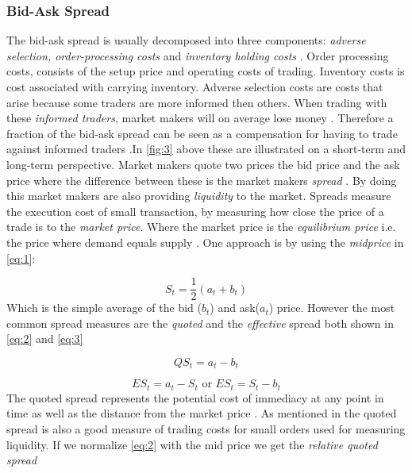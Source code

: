 \documentclass{kththesis}
\theoremstyle{definition}
\begin{document}
\subsubsection*{Bid-Ask Spread}

The bid-ask spread is usually decomposed into three components: \textit{adverse selection, order-processing costs} and \textit{inventory holding costs} \parencite{foucault2013market}. Order processing costs, consists of the setup price and operating costs of trading. Inventory costs is cost associated with carrying inventory. Adverse selection costs are costs that arise because some traders are more informed then others. When trading with these \textit{informed traders}, market makers will on average lose money \parencite{darley2007nasdaq}. Therefore a fraction of the bid-ask spread can be seen as a compensation for having to trade against informed traders \parencite{darley2007nasdaq}.In \autoref{fig:3} above these are illustrated on a short-term and long-term perspective.
\newline
\newline
Market makers quote two prices the bid price and the ask price where the difference between these is the market makers \textit{spread} \parencite{madhavan2000market}. By doing this market makers are also providing \textit{liquidity} to the market. Spreads measure the execution cost of small transaction, by measuring how close the price of a trade is to the \textit{market price}. Where the market price is the \textit{equilibrium price} i.e. the price where demand equals supply \parencite{cartea2015algorithmic}. One approach is by using the \textit{midprice} in \autoref{eq:1}:

\begin{equation}
    \label{eq:1}
    S_{t} = \frac{1}{2}(a_t + b_t)
\end{equation}
Which is the simple average of the bid ($b_t$) and ask($a_t$) price.
However the most common spread measures are the \textit{quoted} and the \textit{effective} \parencite{cartea2015algorithmic, foucault2013market} spread both shown in \autoref{eq:2} and \autoref{eq:3}

\begin{equation}
    \label{eq:2}
    QS_t = a_t - b_t
\end{equation}

\begin{equation}
    \label{eq:3}
    ES_t = a_t - S_t \text{ or } ES_t = S_t - b_t
\end{equation}
The quoted spread represents the potential cost of immediacy at any point in time as well as the distance from the market price \parencite{cartea2015algorithmic}. As mentioned in \textcite{foucault2013market} the quoted spread is also a good measure of trading costs for small orders used for measuring liquidity. If we normalize \autoref{eq:2} with the mid price we get the \textit{relative quoted spread} 
\end{document}
